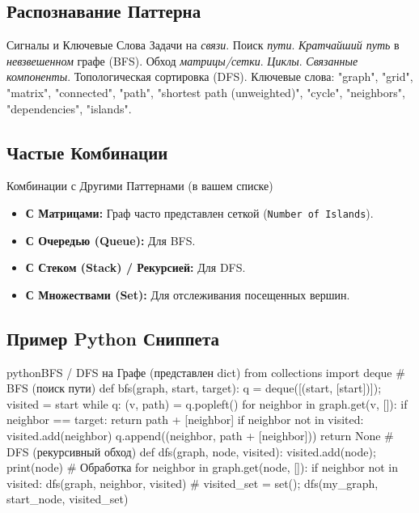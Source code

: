 \subsection{Распознавание Паттерна}
\begin{myblock}{Сигналы и Ключевые Слова}
    Задачи на \emph{связи}. Поиск \emph{пути}. \emph{Кратчайший путь} в \emph{невзвешенном} графе (BFS). Обход \emph{матрицы/сетки}. \emph{Циклы}. \emph{Связанные компоненты}. Топологическая сортировка (DFS). \newline
    Ключевые слова: "graph", "grid", "matrix", "connected", "path", "shortest path (unweighted)", "cycle", "neighbors", "dependencies", "islands".
\end{myblock}

\subsection{Частые Комбинации}
\begin{myblock}{Комбинации с Другими Паттернами (в вашем списке)}
    \begin{itemize}[nosep, leftmargin=*]
        \item \textbf{С Матрицами:} Граф часто представлен сеткой (\texttt{Number of Islands}).
        \item \textbf{С Очередью (Queue):} Для BFS.
        \item \textbf{С Стеком (Stack) / Рекурсией:} Для DFS.
        \item \textbf{С Множествами (Set):} Для отслеживания посещенных вершин.
    \end{itemize}
\end{myblock}

\subsection{Пример Python Сниппета}
\begin{codebox}{python}{BFS / DFS на Графе (представлен dict)}
from collections import deque
# BFS (поиск пути)
def bfs(graph, start, target):
    q = deque([(start, [start])]); visited = {start}
    while q:
        (v, path) = q.popleft()
        for neighbor in graph.get(v, []):
            if neighbor == target: return path + [neighbor]
            if neighbor not in visited:
                visited.add(neighbor)
                q.append((neighbor, path + [neighbor]))
    return None
# DFS (рекурсивный обход)
def dfs(graph, node, visited):
    visited.add(node); print(node) # Обработка
    for neighbor in graph.get(node, []):
        if neighbor not in visited:
            dfs(graph, neighbor, visited)
# visited_set = set(); dfs(my_graph, start_node, visited_set)
\end{codebox}

